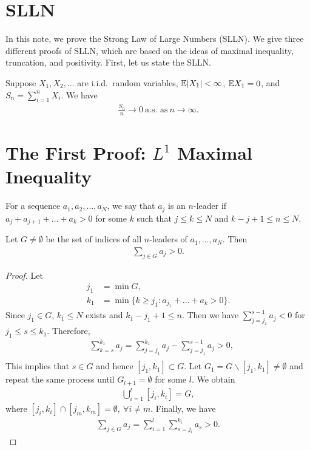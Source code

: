 \documentclass[12pt]{article}
\begin{document}

\section{SLLN}
In this note, we prove the Strong Law of Large Numbers (SLLN). We give three different proofs of SLLN, which are based on the ideas of maximal inequality, truncation, and positivity. First, let us state the SLLN.

\begin{Theorem}
Suppose $X_1, X_2, \ldots$ are i.i.d.\ random variables, $\E |X_1| < \infty$, $\E X_1 = 0$, and $S_n = \sum_{i=1}^n X_i$. We have
\begin{align*}
\frac{S_n}{n} \to 0 \ \text{a.s. as} \ n \to \infty. 
\end{align*}
\end{Theorem}

\section{The First Proof: \texorpdfstring{$L^1$}{L1} Maximal Inequality}

For a sequence $a_1, a_2, \ldots, a_N$, we say that $a_j$ is an $n$-leader if $a_j + a_{j+1} + \ldots + a_k > 0$ for some $k$ such that $j \leq k \leq N$ and $k - j + 1 \leq n \leq N$.

\begin{Lemma} \label{wk7:lemma:n_leader}
Let $G \neq \emptyset$ be the set of indices of all $n$-leaders of $a_1, \ldots, a_N$. Then
\begin{align*}
\sum_{j \in G} a_j > 0.
\end{align*}
\end{Lemma}
\begin{proof}
Let
\begin{align*}
j_1 &= \min G, \\
k_1 &= \min \{k \geq j_1 : a_{j_1} + \ldots + a_k > 0\}.
\end{align*}
Since $j_1\in G$, $k_1 \leq N$ exists and $k_1 - j_1 + 1 \leq n$. Then we have $\sum_{j = j_1}^{s-1} a_j < 0$ for $j_1 \leq s \leq k_1$. Therefore, 
\begin{align*}
&\sum_{k=s}^{k_1} a_j = \sum_{j=j_1}^{k_1} a_j - \sum_{j=j_1}^{s-1} a_j > 0, \\
\end{align*}
This implies that $s \in G$ and hence $\left[j_1, k_1\right] \subset G$. Let $G_1 = G \backslash \left[j_1, k_1\right] \neq \emptyset$ and repeat the same process until $G_{l+1}=\emptyset$ for some $l$. We obtain
\begin{align*}
\bigcup_{i=1}^{l} [j_i, k_i] = G,
\end{align*}
where $\left[j_i, k_i\right] \cap \left[j_m, k_m\right] = \emptyset,\ \forall i \neq m$. Finally, we have
\begin{align*}
\sum_{j \in G} a_j = \sum_{i=1}^{l} \sum_{s=j_i}^{k_i} a_s > 0.
\end{align*}
\end{proof}
\end{document}
